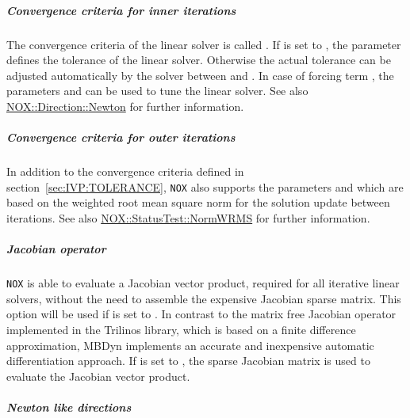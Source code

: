 \subparagraph{Convergence criteria for inner iterations}
The convergence criteria of the linear solver is called . If  is set to , the parameter  defines the tolerance of the linear solver. Otherwise the actual tolerance can be adjusted automatically by the solver between  and . In case of forcing term , the parameters  and  can be used to tune the linear solver. See also \href{https://docs.trilinos.org/latest-release/packages/nox/doc/html/classNOX_1_1Direction_1_1Newton.html}{NOX::Direction::Newton} for further information.
\subparagraph{Convergence criteria for outer iterations}
In addition to the convergence criteria defined in section~\ref{sec:IVP:TOLERANCE}, \verb;NOX; also supports the parameters  and  which are based on the weighted root mean square norm for the solution update between iterations. See also \href{https://docs.trilinos.org/latest-release/packages/nox/doc/html/classNOX_1_1StatusTest_1_1NormWRMS.html}{NOX::StatusTest::NormWRMS} for further information.
\subparagraph{Jacobian operator}
\verb;NOX; is able to evaluate a Jacobian vector product, required for all iterative linear solvers, without the need to assemble the expensive Jacobian sparse matrix. This option will be used if  is set to . In contrast to the matrix free Jacobian operator implemented in the Trilinos library, which is based on a finite difference approximation, MBDyn implements an accurate and inexpensive automatic differentiation approach. If  is set to , the sparse Jacobian matrix is used to evaluate the Jacobian vector product.
\subparagraph{Newton like directions}

